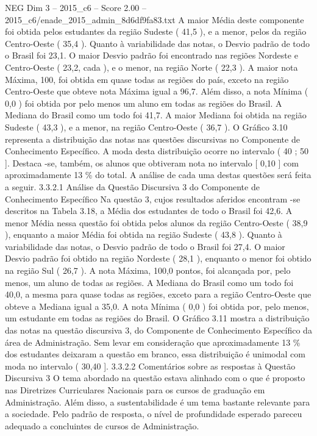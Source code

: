 \begin{textsample}{NEG Dim 3 – 2015\_c6 – Score 2.00 – 2015\_c6/enade\_2015\_admin\_8d6df9fa83.txt}
A maior Média deste componente foi obtida pelos estudantes da região Sudeste ( 41,5 ), e a menor, pelos da região Centro-Oeste ( 35,4 ).
Quanto à variabilidade das notas, o Desvio padrão de todo o Brasil foi 23,1.
O maior Desvio padrão foi encontrado nas regiões Nordeste e Centro-Oeste ( 23,2, cada ), e o menor, na região Norte ( 22,3 ).
A maior nota Máxima, 100, foi obtida em quase todas as regiões do país, exceto na região Centro-Oeste que obteve nota Máxima igual a 96,7.
Além disso, a nota Mínima ( 0,0 ) foi obtida por pelo menos um aluno em todas as regiões do Brasil.
A Mediana do Brasil como um todo foi 41,7.
A maior Mediana foi obtida na região Sudeste ( 43,3 ), e a menor, na região Centro-Oeste ( 36,7 ).
O Gráfico 3.10 representa a distribuição das notas nas questões discursivas no Componente de Conhecimento Específico.
A moda desta distribuição ocorre no intervalo ( 40 ; 50 ].
Destaca -se, também, os alunos que obtiveram nota no intervalo [ 0,10 ] com aproximadamente 13 \% do total.
A análise de cada uma destas questões será feita a seguir. 3.3.2.1 Análise da Questão Discursiva 3 do Componente de Conhecimento Específico Na questão 3, cujos resultados aferidos encontram -se descritos na Tabela 3.18, a Média dos estudantes de todo o Brasil foi 42,6.
A menor Média nessa questão foi obtida pelos alunos da região Centro-Oeste ( 38,9 ), enquanto a maior Média foi obtida na região Sudeste ( 43,8 ).
Quanto à variabilidade das notas, o Desvio padrão de todo o Brasil foi 27,4.
O maior Desvio padrão foi obtido na região Nordeste ( 28,1 ), enquanto o menor foi obtido na região Sul ( 26,7 ).
A nota Máxima, 100,0 pontos, foi alcançada por, pelo menos, um aluno de todas as regiões.
A Mediana do Brasil como um todo foi 40,0, a mesma para quase todas as regiões, exceto para a região Centro-Oeste que obteve a Mediana igual a 35,0.
A nota Mínima ( 0,0 ) foi obtida por, pelo menos, um estudante em todas as regiões do Brasil.
O Gráfico 3.11 mostra a distribuição das notas na questão discursiva 3, do Componente de Conhecimento Específico da área de Administração.
Sem levar em consideração que aproximadamente 13 \% dos estudantes deixaram a questão em branco, essa distribuição é unimodal com moda no intervalo ( 30,40 ]. 3.3.2.2 Comentários sobre as respostas à Questão Discursiva 3 O tema abordado na questão estava alinhado com o que é proposto nas Diretrizes Curriculares Nacionais para os cursos de graduação em Administração.
Além disso, a sustentabilidade é um tema bastante relevante para a sociedade.
Pelo padrão de resposta, o nível de profundidade esperado pareceu adequado a concluintes de cursos de Administração.

\end{textsample}
